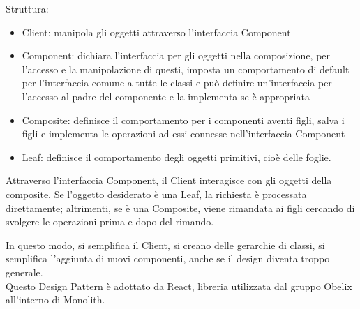 Struttura:
\begin{itemize}
	\item Client: manipola gli oggetti attraverso l'interfaccia Component
	\item Component: dichiara l'interfaccia per gli oggetti nella
     composizione, per l'accesso e la manipolazione di questi, imposta
     un comportamento di default per l'interfaccia comune a tutte le
     classi e può definire un'interfaccia per l'accesso al padre del
     componente e la implementa se è appropriata 
	\item Composite: definisce il comportamento per i componenti aventi figli, salva i figli e implementa le operazioni ad essi connesse nell'interfaccia Component
	\item Leaf: definisce il comportamento degli oggetti primitivi, cioè delle foglie.
\end{itemize}

Attraverso l'interfaccia Component, il Client interagisce con gli
oggetti della composite. Se l'oggetto desiderato è una Leaf, la
richiesta è processata direttamente; altrimenti, se è una Composite,
viene rimandata ai figli cercando di svolgere le operazioni prima e
dopo del rimando. 

In questo modo, si semplifica il Client, si creano delle gerarchie di classi, si semplifica l'aggiunta di nuovi componenti, anche se il design diventa troppo generale. \\
Questo Design Pattern è adottato da React, libreria utilizzata dal gruppo Obelix all'interno di Monolith.
 
























